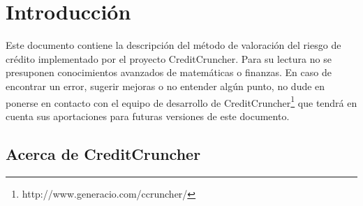 
%
%
%
%
%
%
%
%

\chapter{Introducci\'on}
\label{sec:introduction}

Este documento contiene la descripci\'on del m\'etodo de valoraci\'on del riesgo
de cr\'edito implementado por el proyecto CreditCruncher. Para su lectura no se
presuponen conocimientos avanzados de matem\'aticas o finanzas. En caso de 
encontrar un error, sugerir mejoras o no entender alg\'un punto,
no dude en ponerse en contacto con el equipo de desarrollo de 
CreditCruncher\footnote{http://www.generacio.com/ccruncher/} que tendr\'a en 
cuenta sus aportaciones para futuras versiones de este documento.


\section{Acerca de CreditCruncher}

